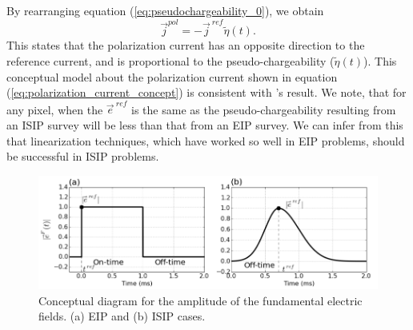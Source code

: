 \documentclass[a4paper, 11pt]{article}
\renewcommand {\j}  { {\vec j} }
\newcommand {\e}  { {\vec e} }
\newcommand{\peta}{\tilde{\eta}}
\newcommand{\eref}{\e^{\ ref}}
\newcommand{\jref}{\j^{\ ref}}
\begin{document}
By rearranging equation (\ref{eq:pseudochargeability_0}), we obtain 
\begin{equation}
  \j^{pol} = -\jref\peta(t). 
  \label{eq:polarization_current_concept}
\end{equation}
This states that the polarization current has an opposite direction to the reference current, and is proportional to the pseudo-chargeability ($\peta(t)$). 
This conceptual model about the polarization current shown in equation (\ref{eq:polarization_current_concept}) is consistent with \cite{seigel1959}'s result. We note, that for any pixel, when the $\eref$  is the same as the pseudo-chargeability resulting from  an ISIP survey  will be less than that from an EIP survey. We can infer from this that  linearization techniques, which  have worked so well in EIP problems, should be successful in ISIP problems. 


\begin{figure}
  \centering  
  \includegraphics[width=1.0\textwidth]{figures/DCEM_F_current.png}
  \caption{Conceptual diagram for the amplitude of the fundamental electric fields. (a) EIP and (b) ISIP cases.}
  \label{F:DCEM_F_current}
\end{figure}  

\end{document}
